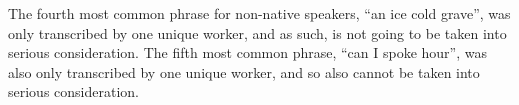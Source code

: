 \begin{enumerate}
The fourth most common phrase for non-native speakers, ``an ice cold grave'', was only transcribed by one unique worker, and as such, is not going to be taken into serious consideration. The fifth most common phrase, ``can I spoke hour'', was also only transcribed by one unique worker, and so also cannot be taken into serious consideration.


\end{enumerate}

